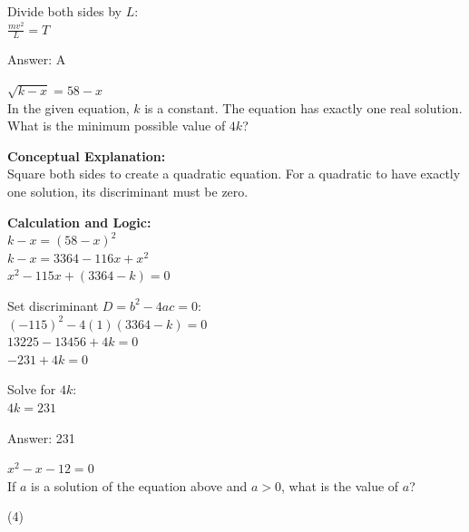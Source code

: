 \documentclass[11pt,paper=a4,answers]{exam}
\begin{document}
\begin{questions}
\begin{solution}
\vspace{10pt}

Divide both sides by $L$: \\
$\frac{mv^2}{L} = T$

\vspace{25pt}

Answer: \colorbox{yellow!100}{A}
\end{solution}

\vspace{40pt}

\question
$\sqrt{k - x} = 58 - x$ \\
In the given equation, $k$ is a constant. The equation has exactly one real solution. What is the minimum possible value of $4k$?

\begin{solution}
\textbf{Conceptual Explanation:} \\
Square both sides to create a quadratic equation. For a quadratic to have exactly one solution, its discriminant must be zero.

\vspace{20pt}

\textbf{Calculation and Logic:} \\
$k - x = (58 - x)^2$ \\
$k - x = 3364 - 116x + x^2$ \\
$x^2 - 115x + (3364 - k) = 0$

\vspace{10pt}

Set discriminant $D = b^2 - 4ac = 0$: \\
$(-115)^2 - 4(1)(3364 - k) = 0$ \\
$13225 - 13456 + 4k = 0$ \\
$-231 + 4k = 0$

\vspace{10pt}

Solve for $4k$: \\
$4k = 231$

\vspace{25pt}

Answer: \colorbox{yellow!100}{231}
\end{solution}

\vspace{40pt}

\question
$x^2 - x - 12 = 0$ \\
If $a$ is a solution of the equation above and $a > 0$, what is the value of $a$?
\begin{tasks}(4)
\end{tasks}


\end{questions}
\end{document}
